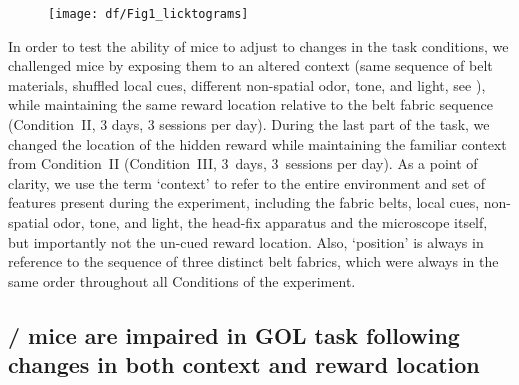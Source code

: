 \begin{figure}
	\centering
	\texttt{[image: df/Fig1\_licktograms]}
	\caption{}
	\label{fig:df:licktograms}
\end{figure}
In order to test the ability of mice to adjust to changes in the task conditions, we challenged mice by exposing them to an altered context (same sequence of belt materials, shuffled local cues, different non-spatial odor, tone, and light, see ), while maintaining the same reward location relative to the belt fabric sequence (Condition~II, 3 days, 3 sessions per day). During the last part of the task, we changed the location of the hidden reward while maintaining the familiar context from Condition~II (Condition~III, 3~days, 3~sessions per day). As a point of clarity, we use the term `context' to refer to the entire environment and set of features present during the experiment, including the fabric belts, local cues, non-spatial odor, tone, and light, the head-fix apparatus and the microscope itself, but importantly not the un-cued reward location. Also, `position' is always in reference to the sequence of three distinct belt fabrics, which were always in the same order throughout all Conditions of the experiment.


\subsection{\df/ mice are impaired in GOL task following changes in both context and reward location}

